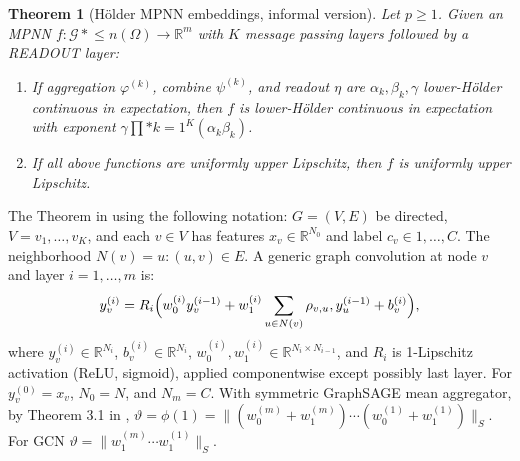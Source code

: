 \documentclass[11pt]{article}\usepackage{amsmath,amssymb,amsthm,bbm}
\newtheorem{theorem}{Theorem}
\newcommand{\1}{\mathbbm{1}}
\begin{document}
\begin{theorem}[Hölder MPNN embeddings, informal version]
Let $p\ge1$. Given an MPNN $f:\mathcal{G}*{\le n}(\Omega)\to\mathbb{R}^m$ with $K$ message passing layers followed by a READOUT layer:
\begin{enumerate}
\item If aggregation $\varphi^{(k)}$, combine $\psi^{(k)}$, and readout $\eta$ are $\alpha_k,\beta_k,\gamma$ lower-Hölder continuous in expectation, then $f$ is lower-Hölder continuous in expectation with exponent $\gamma\prod*{k=1}^K(\alpha_k\beta_k)$.
\item If all above functions are uniformly upper Lipschitz, then $f$ is uniformly upper Lipschitz.
\end{enumerate}
\end{theorem}


The Theorem in \cite{juvina2024training} using the following notation: $G=(V,E)$ be directed, $V={v_1,\ldots,v_K}$, and each $v\in V$ has features $x_v\in\mathbb{R}^{N_0}$ and label $c_v\in{1,\ldots,C}$. The neighborhood $N(v)={u:(u,v)\in E}$. A generic graph convolution at node $v$ and layer $i=1,\ldots,m$ is:
\begin{equation}
y_v^{(i)} = R_i\Bigl(w_0^{(i)}y_v^{(i-1)} + w_1^{(i)}\sum_{u\in N(v)}\rho_{v,u},y_u^{(i-1)} + b_v^{(i)}\Bigr),
\end{equation}
where $y_v^{(i)}\in\mathbb{R}^{N_i}$, $b_v^{(i)}\in\mathbb{R}^{N_i}$, $w_0^{(i)},w_1^{(i)}\in\mathbb{R}^{N_i\times N_{i-1}}$, and $R_i$ is 1-Lipschitz activation (ReLU, sigmoid), applied componentwise except possibly last layer. For $y_v^{(0)}=x_v$, $N_0=N$, and $N_m=C$.
With symmetric GraphSAGE mean aggregator, by Theorem 3.1 in \cite{juvina2024training},
$\vartheta = \phi(1) = \| (w_0^{(m)}+w_1^{(m)})\cdots(w_0^{(1)}+w_1^{(1)})\|_S.$
For GCN 
$\vartheta = \|w_1^{(m)}\cdots w_1^{(1)}\|_S.$
\end{document}
